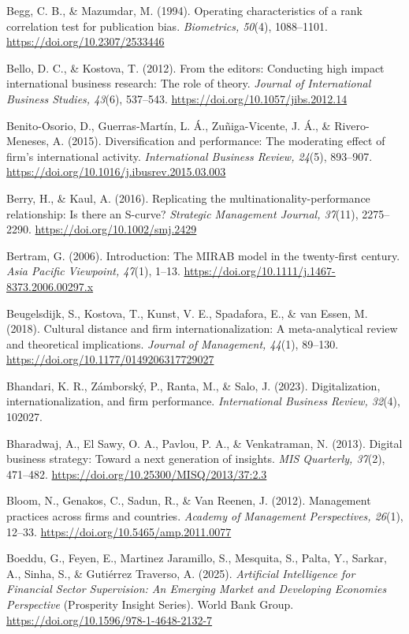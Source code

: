 \documentclass[
  a4paper,
  13pt]{extreport}
\begin{document}
Begg, C. B., \& Mazumdar, M. (1994). Operating characteristics of a rank
correlation test for publication bias. \emph{Biometrics, 50}(4),
1088--1101. \url{https://doi.org/10.2307/2533446}

Bello, D. C., \& Kostova, T. (2012). From the editors: Conducting high
impact international business research: The role of theory.
\emph{Journal of International Business Studies, 43}(6), 537--543.
\url{https://doi.org/10.1057/jibs.2012.14}

Benito-Osorio, D., Guerras-Martín, L. Á., Zuñiga-Vicente, J. Á., \&
Rivero-Meneses, A. (2015). Diversification and performance: The
moderating effect of firm's international activity. \emph{International
Business Review, 24}(5), 893--907.
\url{https://doi.org/10.1016/j.ibusrev.2015.03.003}

Berry, H., \& Kaul, A. (2016). Replicating the
multinationality-performance relationship: Is there an S-curve?
\emph{Strategic Management Journal, 37}(11), 2275--2290.
\url{https://doi.org/10.1002/smj.2429}

Bertram, G. (2006). Introduction: The MIRAB model in the twenty-first
century. \emph{Asia Pacific Viewpoint, 47}(1), 1--13.
\url{https://doi.org/10.1111/j.1467-8373.2006.00297.x}

Beugelsdijk, S., Kostova, T., Kunst, V. E., Spadafora, E., \& van Essen,
M. (2018). Cultural distance and firm internationalization: A
meta-analytical review and theoretical implications. \emph{Journal of
Management, 44}(1), 89--130.
\url{https://doi.org/10.1177/0149206317729027}

Bhandari, K. R., Zámborský, P., Ranta, M., \& Salo, J. (2023).
Digitalization, internationalization, and firm performance.
\emph{International Business Review, 32}(4), 102027.

Bharadwaj, A., El Sawy, O. A., Pavlou, P. A., \& Venkatraman, N. (2013).
Digital business strategy: Toward a next generation of insights.
\emph{MIS Quarterly, 37}(2), 471--482.
\url{https://doi.org/10.25300/MISQ/2013/37:2.3}

Bloom, N., Genakos, C., Sadun, R., \& Van Reenen, J. (2012). Management
practices across firms and countries. \emph{Academy of Management
Perspectives, 26}(1), 12--33.
\url{https://doi.org/10.5465/amp.2011.0077}

Boeddu, G., Feyen, E., Martinez Jaramillo, S., Mesquita, S., Palta, Y.,
Sarkar, A., Sinha, S., \& Gutiérrez Traverso, A. (2025).
\emph{Artificial Intelligence for Financial Sector Supervision: An
Emerging Market and Developing Economies Perspective} (Prosperity
Insight Series). World Bank Group.
\url{https://doi.org/10.1596/978-1-4648-2132-7}
\end{document}
